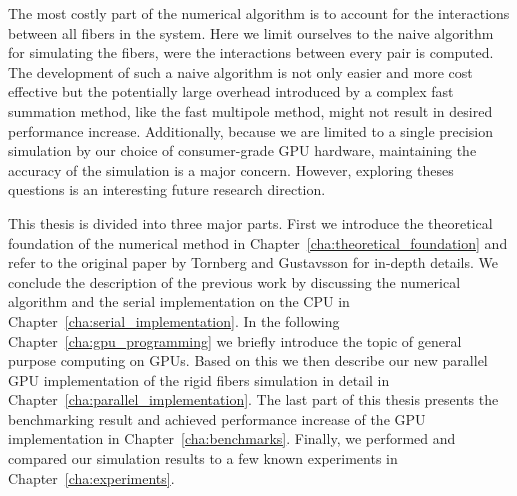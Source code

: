 The most costly part of the numerical algorithm is to account for the interactions between all fibers in the system. Here we limit ourselves to the naive algorithm for simulating the fibers, were the interactions between every pair is computed. The development of such a naive algorithm is not only easier and more cost effective but the potentially large overhead introduced by a complex fast summation method, like the fast multipole method, might not result in desired performance increase. Additionally, because we are limited to a single precision simulation by our choice of consumer-grade GPU hardware, maintaining the accuracy of the simulation is a major concern. However, exploring theses questions is an interesting future research direction.

This thesis is divided into three major parts. First we introduce the theoretical foundation of the numerical method in Chapter~\ref{cha:theoretical_foundation} and refer to the original paper by Tornberg and Gustavsson\cite{Tornberg2006} for in-depth details. We conclude the description of the previous work by discussing the numerical algorithm and the serial implementation on the CPU in Chapter~\ref{cha:serial_implementation}. In the following Chapter~\ref{cha:gpu_programming} we briefly introduce the topic of general purpose computing on GPUs. Based on this we then describe our new parallel GPU implementation of the rigid fibers simulation in detail in Chapter~\ref{cha:parallel_implementation}. The last part of this thesis presents the benchmarking result and achieved performance increase of the GPU implementation in Chapter~\ref{cha:benchmarks}. Finally, we performed and compared our simulation results to a few known experiments in Chapter~\ref{cha:experiments}.
